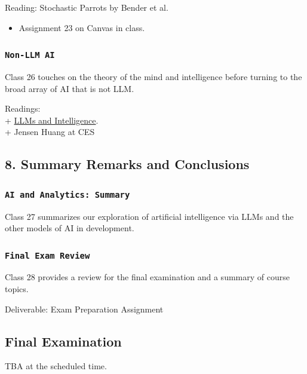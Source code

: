 \documentclass[11pt,]{article}
\begin{document}
Reading: Stochastic Parrots by Bender et al.

\begin{itemize}
\item Assignment 23 on Canvas in class.
\end{itemize}

\subsubsection{\texorpdfstring{\texttt{Non-LLM\ AI}}{Non-LLM AI}}\label{non-llm-ai}

Class 26 touches on the theory of the mind and intelligence before
turning to the broad array of AI that is not LLM.

Readings:\\
+
\href{https://marcushutchins.com/blog/tech/opinions/the-ai-intelligence-paradox.html}{LLMs
and Intelligence}.\\
+ Jensen Huang at CES

\subsection{8. Summary Remarks and
Conclusions}\label{summary-remarks-and-conclusions}

\subsubsection{\texorpdfstring{\texttt{AI\ and\ Analytics:\ Summary}}{AI and Analytics: Summary}}\label{ai-and-analytics-summary}

Class 27 summarizes our exploration of artificial intelligence via LLMs
and the other models of AI in development.

\subsubsection{\texorpdfstring{\texttt{Final\ Exam\ Review}}{Final Exam Review}}\label{final-exam-review}

Class 28 provides a review for the final examination and a summary of
course topics.

Deliverable: Exam Preparation Assignment

\subsection{Final Examination}\label{final-examination}

TBA at the scheduled time.
\end{document}
